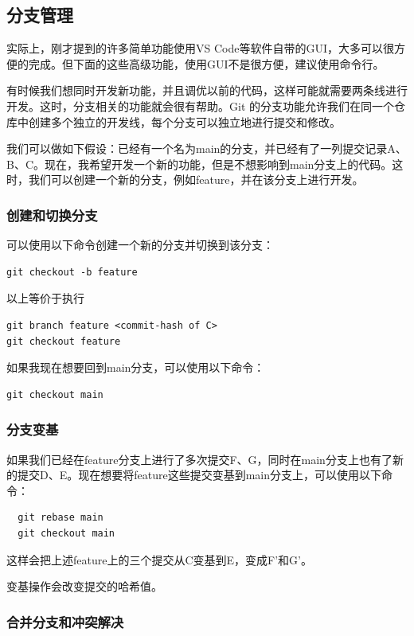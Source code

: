 \documentclass[fontset=none]{ctexart}
\begin{document}
\subsection{分支管理}

实际上，刚才提到的许多简单功能使用VS Code等软件自带的GUI，大多可以很方便的完成。但下面的这些高级功能，使用GUI不是很方便，建议使用命令行。

有时候我们想同时开发新功能，并且调优以前的代码，这样可能就需要两条线进行开发。这时，分支相关的功能就会很有帮助。Git 的分支功能允许我们在同一个仓库中创建多个独立的开发线，每个分支可以独立地进行提交和修改。

我们可以做如下假设：已经有一个名为main的分支，并已经有了一列提交记录A、B、C。现在，我希望开发一个新的功能，但是不想影响到main分支上的代码。这时，我们可以创建一个新的分支，例如feature，并在该分支上进行开发。

\subsubsection{创建和切换分支}

可以使用以下命令创建一个新的分支并切换到该分支：
\begin{verbatim}
git checkout -b feature
\end{verbatim}

以上等价于执行
\begin{verbatim}
git branch feature <commit-hash of C>
git checkout feature
\end{verbatim}

如果我现在想要回到main分支，可以使用以下命令：
\begin{verbatim}
git checkout main
\end{verbatim}

\subsubsection{分支变基}

如果我们已经在feature分支上进行了多次提交F、G，同时在main分支上也有了新的提交D、E。现在想要将feature这些提交变基到main分支上，可以使用以下命令：
\begin{verbatim}
  git rebase main
  git checkout main
\end{verbatim}
这样会把上述feature上的三个提交从C变基到E，变成F'和G'。

变基操作会改变提交的哈希值。

\subsubsection{合并分支和冲突解决}
\end{document}
